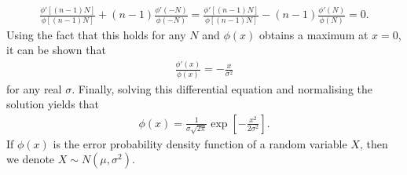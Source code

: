 \documentclass{memoir}
\begin{document}
\begin{align*}
    \frac{\phi'[(n-1)N]}{\phi[(n-1)N]} + (n-1)\frac{\phi'(-N)}{\phi(-N)} = \frac{\phi'[(n-1)N]}{\phi[(n-1)N]} - (n-1)\frac{\phi'(N)}{\phi(N)}=0.
\end{align*}
Using the fact that this holds for any $N$ and $\phi(x)$ obtains a maximum at $x=0$, it can be shown that
\begin{align*}
    \frac{\phi'(x)}{\phi(x)} = -\frac{x}{ \sigma^2}
\end{align*}
for any real $\sigma$. Finally, solving this differential equation and normalising the solution yields that
\begin{align*}
    \phi(x)=\frac{1}{\sigma \sqrt{2 \pi}}\exp\left[-\frac{x^2}{2 \sigma^2}\right].
\end{align*}
If $\phi(x)$ is the error probability density function of a random variable $X$, then we denote $X \sim N(\mu,\sigma^2)$.
\end{document}
